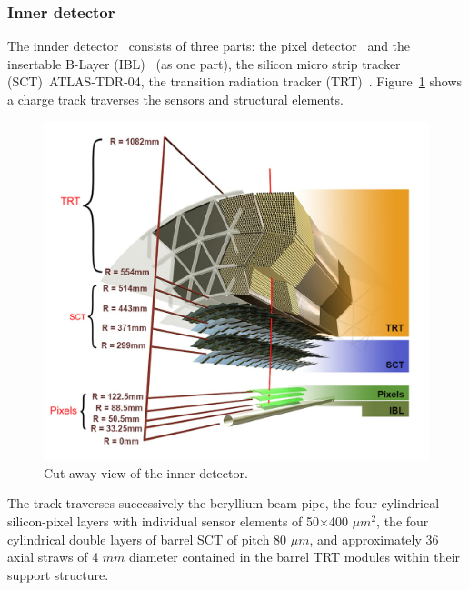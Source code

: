 \documentclass[letterpaper,12pt]{article}
\begin{document}
\subsubsection{Inner detector}	
	The innder detector~\cite{ATLAS-TDR-04} consists of three parts: the pixel detector~\cite{ATLAS-TDR-11}
	and	the insertable B-Layer (IBL)~\cite{ATLAS-TDR-19} (as one part),
	the silicon micro strip tracker (SCT)~\cite{}{ATLAS-TDR-04}, the transition radiation
	tracker (TRT)~\cite{ATLAS-TDR-04}. 
	Figure~\ref{fig:inner_detector} shows a 
	charge track traverses the sensors and structural
	elements. 
	\begin{figure}[bht]
		\begin{centering}	
		\includegraphics[width=.55\textwidth]{Detector_plots/Inner detector.png}
		\caption{Cut-away view of the inner detector.}
		\label{fig:inner_detector}
	\end{centering}
	\end{figure}
	The track traverses successively the beryllium
	beam-pipe, the four cylindrical silicon-pixel layers 
	with individual 
	sensor elements of 50$\times$400 $\mu m^2$, the four cylindrical double 
	layers of barrel SCT of pitch 80 $\mu m$, 
	and approximately 36 axial straws of 4 $mm$ diameter 
	contained in the barrel TRT
	modules within their support structure.
\end{document}
